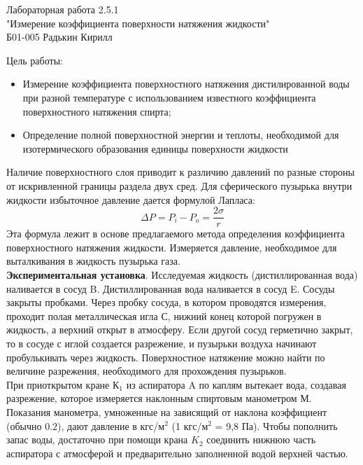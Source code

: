 \documentclass[12pt,a4paper]{article}
\begin{document}
    \begin{center}
        Лабораторная работа 2.5.1
        \\
        "Измерение коэффициента поверхности натяжения жидкости"
        \\
        Б01-005 Радькин Кирилл
    \end{center}
    Цель работы:
    \begin{itemize}
        \item Измерение коэффициента поверхностного натяжения дистилированной воды при разной температуре с использованием известного коэффициента поверхностного натяжения спирта; 
        \item Определение полной поверхностной энергии и теплоты, необходимой для изотермического образования единицы поверхности жидкости
    \end{itemize}
    
    Наличие поверхностного слоя приводит к различию давлений по разные стороны от искривленной границы раздела двух сред. Для сферического пузырька внутри жидкости избыточное давление дается формулой Лапласа:
    \begin{equation}
    \Delta P = P_{i} - P_{o} = \dfrac{2 \sigma}{r}
    \end{equation}
    Эта формула лежит в основе предлагаемого метода определения коэффициента поверхностного натяжения жидкости. Измеряется давление, необходимое для выталкивания в жидкость пузырька газа.\\

    \textbf{Экспериментальная установка}. Исследуемая жидкость (дистиллированная вода) наливается в сосуд B. Дистиллированная вода наливается в сосуд E. Сосуды закрыты пробками. Через пробку сосуда, в котором проводятся измерения, проходит полая металлическая игла С, нижний конец которой погружен в жидкость, а верхний открыт в атмосферу. Если другой сосуд герметично закрыт, то в сосуде с иглой создается разрежение, и пузырьки воздуха начинают пробулькивать через жидкость. Поверхностное натяжение можно найти по величине разрежения, необходимого для прохождения пузырьков.\\
     
    При приоткрытом кране $К_1$ из аспиратора A по каплям вытекает вода, создавая разрежение, которое измеряется наклонным спиртовым манометром М. Показания манометра, умноженные на зависящий от наклона коэффициент (обычно $0.2$), дают давление в кгс/м$^2$ (1 кгс/м$^2$ = 9,8 Па). Чтобы пополнить запас воды, достаточно при помощи крана $K_2$ соединить нижнюю часть аспиратора с атмосферой и предварительно заполненной водой верхней частью.\\ 
    
\end{document}
